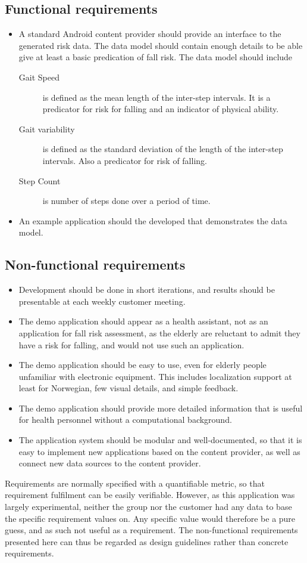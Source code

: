 \subsection{Functional requirements}
\begin{itemize}
\item A standard Android content provider should provide an interface to the generated risk data. The data model should contain enough details to be able give at least a basic predication of fall risk. The data model should include 
\begin{description}
\item[Gait Speed] \label{def:gaitSpeed}is defined as the mean length of the inter-step intervals. It is a predicator for risk for falling and an indicator of physical ability.
\item[Gait variability] \label{def:gaitVariability}is defined as the standard deviation of the length of the inter-step intervals. Also a predicator for risk of falling.
\item[Step Count] \label{def:stepCount}is number of steps done over a period of time. 
\end{description}
\item An example application should the developed that demonstrates the data model.
\end{itemize}	

\subsection{Non-functional requirements}
\begin{itemize}
\item Development should be done in short iterations, and results should be presentable at each weekly customer meeting.
\item The demo application should appear as a health assistant, not as an application for fall risk assessment, as the elderly are reluctant to admit they have a risk for falling, and would not use such an application.
\item The demo application should be easy to use, even for elderly people unfamiliar with electronic equipment. This includes localization support at least for Norwegian, few visual details, and simple feedback.
\item The demo application should provide more detailed information that is useful for health personnel without a computational background.
\item The application system should be modular and well-documented, so that it is easy to implement new applications based on the content provider, as well as connect new data sources to the content provider.
\end{itemize}
Requirements are normally specified with a quantifiable metric, so that requirement fulfilment can be easily verifiable. However, as this application was largely experimental, neither the group nor the customer had any data to base the specific requirement values on. Any specific value would therefore be a pure guess, and as such not useful as a requirement. The non-functional requirements presented here can thus be regarded as design guidelines rather than concrete requirements. 

